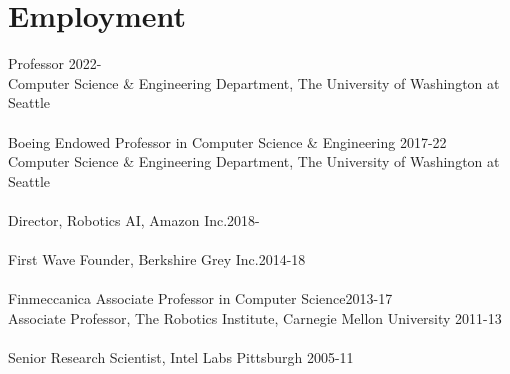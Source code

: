 
\section{Employment}
\noindent
Professor \hfill 2022-\phantom{20}\\
Computer Science \& Engineering Department, 
The University of Washington at Seattle\\
\\
Boeing Endowed Professor in Computer Science \& Engineering \hfill 2017-22\\
Computer Science \& Engineering Department, 
The University of Washington at Seattle\\
\\
Director, Robotics AI, Amazon Inc.\hfill 2018-\phantom{20}\\
\\
First Wave Founder, Berkshire Grey Inc.\hfill 2014-18\\
\\
Finmeccanica Associate Professor in Computer Science\hfill 2013-17\\
Associate Professor, 
The Robotics Institute,  Carnegie Mellon University
\hfill 2011-13\\
\\
Senior Research Scientist, Intel Labs Pittsburgh \hfill 2005-11


